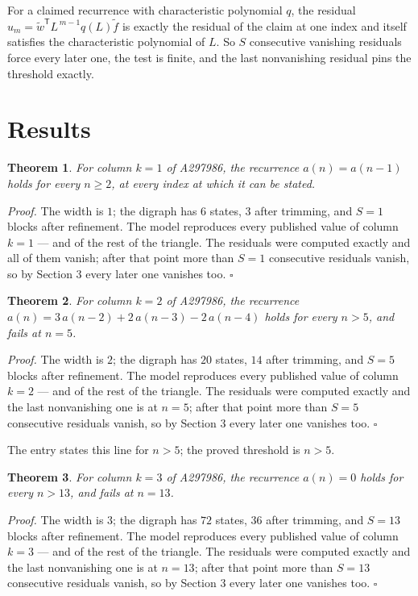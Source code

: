 \documentclass[11pt]{article}
\newtheorem{theorem}{Theorem}
\theoremstyle{definition}
\begin{document}
For a claimed recurrence with characteristic polynomial $q$, the residual $u_m = \tilde w^{\mathsf T}L^{\,m-1}q(L)\tilde f$ is exactly the residual of the claim at one index and itself satisfies the characteristic polynomial of $L$. So $S$ consecutive vanishing residuals force every later one, the test is finite, and the last nonvanishing residual pins the threshold exactly.

\section{Results}

\begin{theorem} For column $k = 1$ of A297986, the recurrence $a(n) = a(n-1)$ holds for every $n \ge 2$, at every index at which it can be stated.\end{theorem}

{\itshape Proof.} The width is $1$; the digraph has $6$ states, $3$ after trimming, and $S = 1$ blocks after refinement. The model reproduces every published value of column $k = 1$ --- and of the rest of the triangle. The residuals were computed exactly and all of them vanish; after that point more than $S = 1$ consecutive residuals vanish, so by Section 3 every later one vanishes too. $\square$

\begin{theorem} For column $k = 2$ of A297986, the recurrence $a(n) = 3\,a(n-2) + 2\,a(n-3) - 2\,a(n-4)$ holds for every $n > 5$, and fails at $n = 5$.\end{theorem}

{\itshape Proof.} The width is $2$; the digraph has $20$ states, $14$ after trimming, and $S = 5$ blocks after refinement. The model reproduces every published value of column $k = 2$ --- and of the rest of the triangle. The residuals were computed exactly and the last nonvanishing one is at $n = 5$; after that point more than $S = 5$ consecutive residuals vanish, so by Section 3 every later one vanishes too. $\square$

The entry states this line for $n > 5$; the proved threshold is $n > 5$.

\begin{theorem} For column $k = 3$ of A297986, the recurrence $a(n) = 0$ holds for every $n > 13$, and fails at $n = 13$.\end{theorem}

{\itshape Proof.} The width is $3$; the digraph has $72$ states, $36$ after trimming, and $S = 13$ blocks after refinement. The model reproduces every published value of column $k = 3$ --- and of the rest of the triangle. The residuals were computed exactly and the last nonvanishing one is at $n = 13$; after that point more than $S = 13$ consecutive residuals vanish, so by Section 3 every later one vanishes too. $\square$
\end{document}
